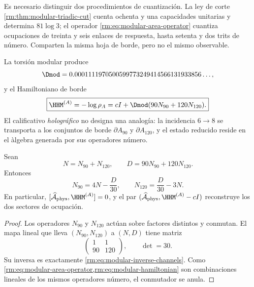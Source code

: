 Es necesario distinguir dos procedimientos de cuantizaci\'on. La ley de corte
\cref{rm:thm:modular-triadic-cut} cuenta ochenta y una capacidades unitarias y
determina \(81\log3\); el operador
\cref{rm:eq:modular-area-operator} cuantiza ocupaciones de treinta y seis
enlaces de respuesta, hasta setenta y dos trits de n\'umero. Comparten la
misma hoja de borde, pero no el mismo observable.

La torsi\'on modular produce
\begin{equation}
\label{rm:eq:modular-delta-value}
\Dmod
=0.0001111970500599773249414566131933856\ldots,
\end{equation}
y el Hamiltoniano de borde
\begin{equation}
\label{rm:eq:modular-hamiltonian}
\boxed{
\HHM^{(A)}=-\log\rho_A
=cI+\Dmod(90N_{90}+120N_{120}).}
\end{equation}
El calificativo \emph{hologr\'afico} no designa una analog\'ia: la
incidencia \(6\to8\) se transporta a los conjuntos de borde
\(\partial A_{90}\) y \(\partial A_{120}\), y el estado reducido reside
en el \`algebra generada por sus operadores n\'umero.

\begin{theorem}
\label{rm:thm:modular-area-memory}
Sean
\begin{equation}
\label{rm:eq:modular-ND}
N=N_{90}+N_{120},
\qquad
D=90N_{90}+120N_{120}.
\end{equation}
Entonces
\begin{equation}
\label{rm:eq:modular-inverse-channels}
\boxed{
N_{90}=4N-\frac{D}{30},
\qquad
N_{120}=\frac{D}{30}-3N.}
\end{equation}
En particular,
\([\widehat{\mathcal A}_{\rm phys},\HHM^{(A)}]=0\), y el par
\((\widehat{\mathcal A}_{\rm phys},\HHM^{(A)}-cI)\) reconstruye los dos
sectores de ocupaci\'on.
\end{theorem}

\begin{proof}
Los operadores \(N_{90}\) y \(N_{120}\) act\'uan sobre factores distintos
y conmutan. El mapa lineal que lleva \((N_{90},N_{120})\) a \((N,D)\)
tiene matriz
\[
\begin{pmatrix}1&1\\90&120\end{pmatrix},
\qquad \det=30.
\]
Su inversa es exactamente \cref{rm:eq:modular-inverse-channels}. Como
\cref{rm:eq:modular-area-operator,rm:eq:modular-hamiltonian} son combinaciones
lineales de los mismos operadores n\'umero, el conmutador se anula.
\end{proof}

